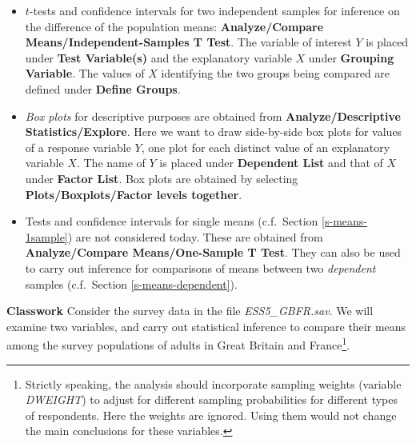 \documentclass[11pt,a4paper,openany]{book}
\let\rmarkdownfootnote\footnote%
\def\footnote{\protect\rmarkdownfootnote}
\begin{document}
\begin{itemize}
\item
  \(t\)-tests and confidence intervals for two independent samples for
  inference on the difference of the population means:
  \textbf{Analyze/Compare Means/Independent-Samples T Test}. The
  variable of interest \(Y\) is placed under \textbf{Test Variable(s)}
  and the explanatory variable \(X\) under \textbf{Grouping Variable}.
  The values of \(X\) identifying the two groups being compared are
  defined under \textbf{Define Groups}.
\item
  \emph{Box plots} for descriptive purposes are obtained from
  \textbf{Analyze/Descriptive Statistics/Explore}. Here we want to draw
  side-by-side box plots for values of a response variable \(Y\), one
  plot for each distinct value of an explanatory variable \(X\). The
  name of \(Y\) is placed under \textbf{Dependent List} and that of
  \(X\) under \textbf{Factor List}. Box plots are obtained by selecting
  \textbf{Plots/Boxplots/Factor levels together}.
\item
  Tests and confidence intervals for single means (c.f.~Section
  \ref{s-means-1sample}) are not considered today. These are obtained
  from \textbf{Analyze/Compare Means/One-Sample T Test}. They can also
  be used to carry out inference for comparisons of means between two
  \emph{dependent} samples (c.f.~Section \ref{s-means-dependent}).
\end{itemize}

\textbf{Classwork} Consider the survey data in the file
\emph{ESS5\_GBFR.sav}. We will examine two variables, and carry out
statistical inference to compare their means among the survey
populations of adults in Great Britain and France\footnote{Strictly
  speaking, the analysis should incorporate sampling weights (variable
  \emph{DWEIGHT}) to adjust for different sampling probabilities for
  different types of respondents. Here the weights are ignored. Using
  them would not change the main conclusions for these variables.}.
\end{document}
